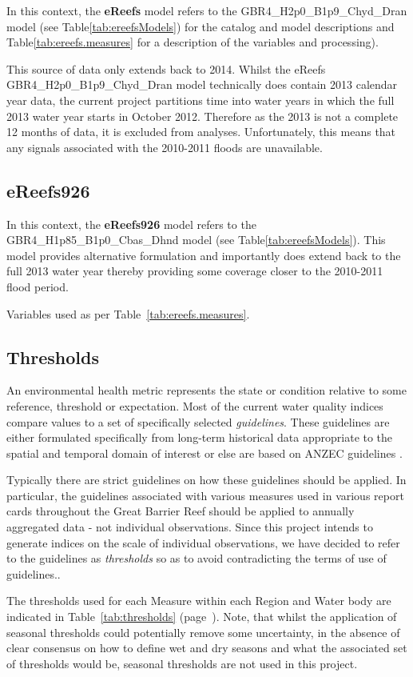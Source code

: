 


In this context, the \textbf{eReefs} model refers to the
GBR4\_H2p0\_B1p9\_Chyd\_Dran model (see Table\ref{tab:ereefsModels}) for the catalog and model descriptions and
Table\ref{tab:ereefs.measures} for a description of the variables and processing).

This source of data only extends back to 2014. Whilst the eReefs GBR4\_H2p0\_B1p9\_Chyd\_Dran model technically does
contain 2013 calendar year data, the current project partitions time into water years in which the
full 2013 water year starts in October 2012.  Therefore as the 2013 is not a complete 12 months of
data, it is excluded from analyses. Unfortunately, this means that any signals associated with the
2010-2011 floods are unavailable.
 
    
      

\subsection{eReefs926}

In this context, the \textbf{eReefs926} model refers to the
GBR4\_H1p85\_B1p0\_Cbas\_Dhnd  model (see Table\ref{tab:ereefsModels}). This model provides alternative formulation
and importantly does extend back to the full 2013 water year thereby providing some coverage closer
to the 2010-2011 flood period.

Variables used as per Table~\ref{tab:ereefs.measures}.

\subsection{Thresholds}

An environmental health metric represents the state or condition relative to some reference,
threshold or expectation.  Most of the current water quality indices compare values to a set of
specifically selected \textit{guidelines}.  These guidelines are either formulated specifically from
long-term historical data appropriate to the spatial and temporal domain of interest or else are
based on ANZEC guidelines \citep{ANZEC-2000}.
 
Typically there are strict guidelines on how these guidelines should be applied.  In particular, the
guidelines associated with various measures used in various report cards throughout the Great
Barrier Reef should be applied to annually aggregated data - not individual observations.  Since
this project intends to generate indices on the scale of individual observations, we have decided to
refer to the guidelines as \textit{thresholds} so as to avoid contradicting the terms of use of
guidelines..
 
The thresholds used for each Measure within each Region and Water body are indicated in
Table~\ref{tab:thresholds} (page~\pageref{tab:thresholds}).  Note, that whilst the application of
seasonal thresholds could potentially remove some uncertainty, in the absence of clear consensus on
how to define wet and dry seasons and what the associated set of thresholds would be, seasonal
thresholds are not used in this project.
